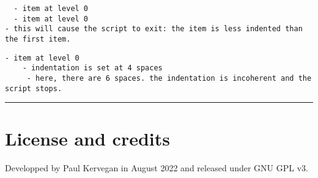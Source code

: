 \documentclass[a4paper, 12pt, twoside]{book}
\begin{document}
\begin{lstlisting}
  - item at level 0
  - item at level 0
- this will cause the script to exit: the item is less indented than the first item.
\end{lstlisting}

\begin{lstlisting}
- item at level 0
	- indentation is set at 4 spaces
	 - here, there are 6 spaces. the indentation is incoherent and the script stops.
\end{lstlisting}

\par\noindent\rule{\linewidth}{0.4pt}
\section*{License and credits}

Developped by Paul Kervegan in August 2022 and released under GNU GPL v3.


\clearpage
\tableofcontents
\end{document}
